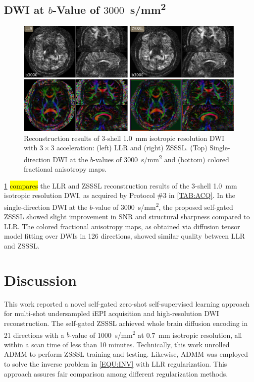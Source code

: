 \documentclass[journal,twoside,web]{ieeecolor}
\begin{document}
	\subsection{DWI at $b$-Value of $3000$~\si{s/mm^2}}

	\begin{figure}
		\includegraphics[width=\textwidth]{../figures/fig7.png}
		\caption{Reconstruction results of 3-shell \SI{1.0}{mm} isotropic resolution
			DWI with $3 \times 3$ acceleration: (left) LLR and (right) ZSSSL.
			(Top) Single-direction DWI at the $b$-values of
			\SI{3000}{s/mm^2} and
			(bottom) colored fractional anisotropy maps.}
		\label{FIG:B3000}
	\end{figure}

	\cref{FIG:B3000} \hl{compares} the LLR and ZSSSL reconstruction results
	of the 3-shell \SI{1.0}{mm} isotropic resolution DWI,
	as acquired by Protocol \#3 in \cref{TAB:ACQ}.
	In the single-direction DWI at the $b$-value of \SI{3000}{s/mm^2},
	the proposed self-gated ZSSSL
	showed slight improvement in SNR and structural sharpness
	compared to LLR. The colored fractional anisotropy maps,
	as obtained via diffusion tensor model fitting over DWIs in 126 directions,
	showed similar quality between LLR and ZSSSL.



	\section{Discussion}

	This work reported a novel self-gated zero-shot self-supervised learning approach
	for multi-shot undersampled iEPI acquisition and high-resolution DWI reconstruction.
	The self-gated ZSSSL achieved whole brain diffusion encoding in 21 directions
	with a $b$-value of \SI{1000}{s/mm^2}
	at \SI{0.7}{mm} isotropic resolution,
	all within a scan time of less than 10 minutes.
	Technically, this work unrolled ADMM to perform ZSSSL training and testing.
	Likewise, ADMM was employed to solve the inverse problem in \cref{EQU:INV}
	with LLR regularization.
	This approach assures fair comparison among different regularization methods.
\end{document}

